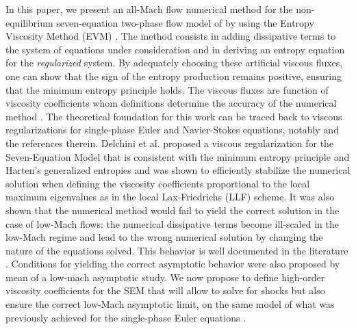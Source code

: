 \documentclass[preprint,10pt]{elsarticle}
\begin{document}
In this paper, we present an all-Mach flow numerical method for the non-equilibrium seven-equation two-phase flow model of \cite{SEM} by using the Entropy Viscosity Method (EVM) \cite{jlg, jlg2}. The method consists in adding dissipative terms to the system of equations under 
consideration and in deriving an entropy equation for the {\it regularized} system. By adequately choosing these artificial viscous fluxes, one can 
show that the sign of the entropy production remains positive, ensuring that the minimum entropy principle holds. The viscous fluxes are function of viscosity coefficients whom definitions determine the accuracy of the numerical method \cite{jlg}. The theoretical foundation for this work can be traced back to viscous regularizations for single-phase Euler and Navier-Stokes equations, notably \cite{jlg} and the references therein. Delchini et al. \cite{Marco_paper_sem} proposed a viscous regularization for the Seven-Equation Model that is consistent with the minimum entropy principle and Harten's generalized entropies and was shown to efficiently stabilize the numerical solution when defining the viscosity coefficients proportional to the local maximum eigenvalues as in the local Lax-Friedrichs (LLF) scheme. It was also shown that the numerical method would fail to yield the correct solution in the case of low-Mach flows: the numerical dissipative terms become 
ill-scaled in the low-Mach regime and lead to the wrong numerical solution by changing the nature of the equations solved. This 
behavior is well documented in the literature \cite{LowMach1, LowMach2, LowMach3}. Conditions for yielding the correct asymptotic behavior were also proposed by mean of a low-mach asymptotic study. We now propose to define high-order viscosity coefficients for the SEM that will allow to solve for shocks but also ensure the correct low-Mach asymptotic limit, on the same model of what was previously achieved for the single-phase Euler equations \cite{Marco_paper_low_mach}.
%
\end{document}
